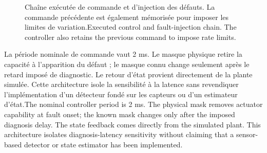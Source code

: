 \documentclass[11pt,a4paper,oneside]{report}
\newcommand{\bi}[2]{\iffrench #2\else #1\fi}
\begin{document}
\begin{figure}[H]
\caption{\bi{Executed control and fault-injection chain. The controller also retains the previous command to impose rate limits.}{Chaîne exécutée de commande et d'injection des défauts. La commande précédente est également mémorisée pour imposer les limites de variation.}}
\label{fig:chain}\end{figure}
\bi{The nominal controller period is 2 ms. The physical mask removes actuator capability at fault onset; the known mask changes only after the imposed diagnosis delay. The state feedback comes directly from the simulated plant. This architecture isolates diagnosis-latency sensitivity without claiming that a sensor-based detector or state estimator has been implemented.}{La période nominale de commande vaut 2 ms. Le masque physique retire la capacité à l'apparition du défaut ; le masque connu change seulement après le retard imposé de diagnostic. Le retour d'état provient directement de la plante simulée. Cette architecture isole la sensibilité à la latence sans revendiquer l'implémentation d'un détecteur fondé sur les capteurs ou d'un estimateur d'état.}
\end{document}
